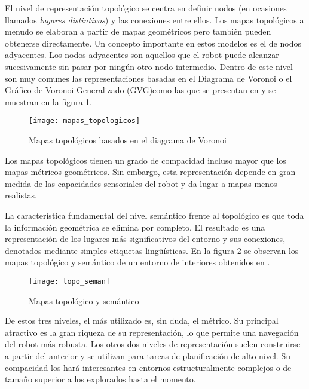 El nivel de representación topológico se centra en definir nodos (en ocasiones llamados \emph{lugares distintivos}) y las conexiones entre ellos. Los mapas topológicos a menudo se elaboran a partir de mapas geométricos pero también pueden obtenerse directamente. Un concepto importante en estos modelos es el de nodos adyacentes. Los nodos adyacentes son aquellos que el robot puede alcanzar sucesivamente sin pasar por ningún otro nodo intermedio. Dentro de este nivel son muy comunes las representaciones basadas en el Diagrama de Voronoi o el Gráfico de Voronoi Generalizado (GVG)como las que se presentan en \cite{Choset01} y se muestran en la figura \ref{fg:topologicos}.

\begin{figure}[hbtp]
  \centering\texttt{[image: mapas\_topologicos]}\\
  \caption{Mapas topológicos basados en el diagrama de Voronoi}\label{fg:topologicos}
\end{figure}

Los mapas topológicos tienen un grado de compacidad incluso mayor que los mapas métricos geométricos. Sin embargo, esta representación depende en gran medida de las capacidades sensoriales del robot y da lugar a mapas menos realistas.

La característica fundamental del nivel semántico frente al topológico es que toda la información geométrica se elimina por completo. El resultado es una representación de los lugares más significativos del entorno y sus conexiones, denotados mediante simples etiquetas lingüísticas. En la figura \ref{fg:semantico} se observan los mapas topológico y semántico de un entorno de interiores obtenidos en \cite{Kuipers91}.

\begin{figure}[hbtp]
  \centering\texttt{[image: topo\_seman]}\\
  \caption{Mapas topológico y semántico}\label{fg:semantico}
\end{figure}

De estos tres niveles, el más utilizado es, sin duda, el métrico. Su principal atractivo es la gran riqueza de su representación, lo que permite una navegación del robot más robusta. Los otros dos niveles de representación suelen construirse a partir del anterior y se utilizan para tareas de planificación de alto nivel. Su compacidad los hará interesantes en entornos estructuralmente complejos o de tamaño superior a los explorados hasta el momento.


